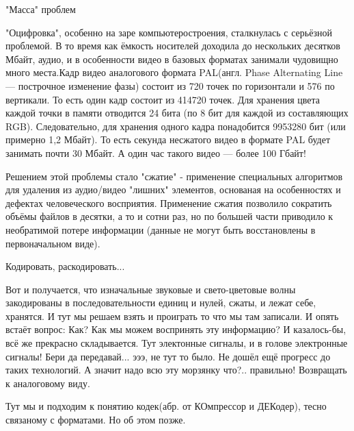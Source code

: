 \documentclass[aspectratio=169]{beamer}
\newcommand{\n}{\normalsize}
\begin{document}
\begin{frame}[shrink=11]{"Масса" проблем}

"Оцифровка", особенно на заре компьютеростроения, сталкнулась с серьёзной проблемой. В то время как ёмкость носителей доходила до нескольких десятков Мбайт, аудио, и в особенности видео в базовых форматах занимали чудовищно много места.Кадр видео аналогового формата \alert{PAL}(англ. Phase Alternating Line — построчное изменение фазы) состоит из  720  точек по горизонтали и  576  по вертикали. То есть один кадр состоит из  414720  точек.
Для хранения цвета каждой точки в памяти отводится  24  бита (по  8  бит для каждой из составляющих RGB).
Следовательно, для хранения одного кадра понадобится  9953280  бит (или примерно  1,2  Мбайт).
То есть секунда несжатого видео в формате PAL будет занимать почти  30  Мбайт. А один час такого видео — более  100 Гбайт!

\vspace{10pt}

Решением этой проблемы стало \alert{"сжатие"} - применение специальных алгоритмов для удаления из аудио/видео "лишних" элементов, основаная на особенностях и дефектах человеческого восприятия. Применение сжатия позволило сократить объёмы файлов в десятки, а то и сотни раз, но по большей части приводило к необратимой потере информации (данные не могут быть восстановлены в первоначальном виде).
\end{frame}
\begin{frame}{Кодировать, раскодировать...}%

    Вот и получается, что изначальные звуковые и свето-цветовые волны закодированы в последовательности единиц и нулей, сжаты, и лежат себе, хранятся. И тут мы решаем взять и проиграть то что мы там записали. И опять встаёт вопрос: Как? Как мы можем воспринять эту информацию? И казалось-бы, всё же прекрасно складывается. Тут электонные сигналы, и в голове электронные сигналы! Бери да передавай... эээ, не тут то было. Не дошёл ещё прогресс до таких технологий. А значит надо всю эту морзянку что?.. правильно! Возвращать к \alert{аналоговому} виду.
    
    \vspace{10pt}
    
    Тут мы и подходим к понятию \alert{кодек}(\footnotesize абр. от КОмпрессор и ДЕКодер), \n тесно связаному с форматами. Но об этом позже.
\end{frame}
\end{document}
